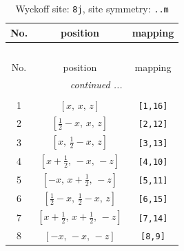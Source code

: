 \documentclass[fleqn,8pt]{jsarticle}
\begin{document}
\begin{longtable}{ccc}
\caption{Wyckoff site: {\tt 8j}, site symmetry: {\tt ..m}}
 \\
 \hline \hline
No. & position & mapping \\ \hline \endfirsthead

\multicolumn{2}{l}{\tablename\ \thetable{}} \\
 \hline \hline
No. & position & mapping \\ \hline \endhead

 \hline \hline
\multicolumn{2}{r}{\footnotesize\it continued ...} \\ \endfoot

 \hline \hline
\multicolumn{2}{r}{} \\ \endlastfoot

1 & $\left[ x,\, x,\, z \right]$ & {\tt [1,16]} \\ \hline
2 & $\left[ \frac{1}{2} - x,\, x,\, z \right]$ & {\tt [2,12]} \\ \hline
3 & $\left[ x,\, \frac{1}{2} - x,\, z \right]$ & {\tt [3,13]} \\ \hline
4 & $\left[ x + \frac{1}{2},\, - x,\, - z \right]$ & {\tt [4,10]} \\ \hline
5 & $\left[ - x,\, x + \frac{1}{2},\, - z \right]$ & {\tt [5,11]} \\ \hline
6 & $\left[ \frac{1}{2} - x,\, \frac{1}{2} - x,\, z \right]$ & {\tt [6,15]} \\ \hline
7 & $\left[ x + \frac{1}{2},\, x + \frac{1}{2},\, - z \right]$ & {\tt [7,14]} \\ \hline
8 & $\left[ - x,\, - x,\, - z \right]$ & {\tt [8,9]} \\
\end{longtable}
\renewcommand{\arraystretch}{1.2}
\end{document}
